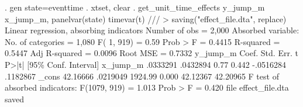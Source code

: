 . gen state=eventtime
{\smallskip}
. xtset, clear
{\smallskip}
. get_unit_time_effects y_jump_m x_jump_m, panelvar(state) timevar(t) ///
> saving("effect_file.dta", replace)
{\smallskip}
Linear regression, absorbing indicators         Number of obs     =      2,000
Absorbed variable: {}          No. of categories =      1,080
                                                F(   1,    919)   =       0.59
                                                Prob > F          =     0.4415
                                                R-squared         =     0.5447
                                                Adj R-squared     =     0.0096
                                                Root MSE          =     0.7332
{\smallskip}
    y_jump_m {\VBAR}      Coef.   Std. Err.      t    P>|t|     [95\% Conf. Interval]
    x_jump_m {\VBAR}   .0333291   .0432894     0.77   0.442    -.0516284    .1182867
       _cons {\VBAR}   42.16666   .0219049  1924.99   0.000     42.12367    42.20965
F test of absorbed indicators: F(1079, 919) = 1.013           Prob > F = 0.420
file effect_file.dta saved
